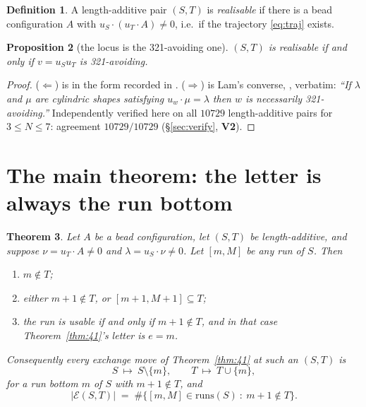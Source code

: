 \documentclass[11pt]{article}
\theoremstyle{plain}
\newtheorem{thm}{Theorem}[section]
\newtheorem{prop}[thm]{Proposition}
\theoremstyle{definition}
\newtheorem{defn}[thm]{Definition}
\begin{document}
\begin{defn}
A length-additive pair $(S,T)$ is \emph{realisable} if there is a bead configuration $A$ with
$u_S\cdot(u_T\cdot A)\ne0$, i.e.\ if the trajectory \eqref{eq:traj} exists.
\end{defn}

\begin{prop}[the locus is the 321-avoiding one]\label{prop:locus}
$(S,T)$ is realisable if and only if $v=u_Su_T$ is 321-avoiding.
\end{prop}

\begin{proof}
($\Leftarrow$) is \cite[\texttt{thm:321}, l.1844--47]{Lam2006} in the form recorded in
\cite[Thm.~5.2]{Clio321}. ($\Rightarrow$) is Lam's converse,
\cite[l.1871--73]{Lam2006}, verbatim: \emph{``If $\lambda$ and $\mu$ are cylindric shapes
satisfying $u_w\cdot\mu=\lambda$ then $w$ is necessarily 321-avoiding.''}
Independently verified here on all $10729$ length-additive pairs for $3\le N\le7$: agreement
$10729/10729$ (\S\ref{sec:verify}, \textbf{V2}).
\end{proof}

\section{The main theorem: the letter is always the run bottom}\label{sec:main}

\begin{thm}\label{thm:main}
Let $A$ be a bead configuration, let $(S,T)$ be length-additive, and suppose
$\nu=u_T\cdot A\ne0$ and $\lambda=u_S\cdot\nu\ne0$. Let $[m,M]$ be any run of $S$. Then
\begin{enumerate}
\item[(a)] $m\notin T$;
\item[(b)] either $m+1\notin T$, or $[m+1,M+1]\subseteq T$;
\item[(c)] the run is usable if and only if $m+1\notin T$, and in that case Theorem~\ref{thm:41}'s
letter is $e=m$.
\end{enumerate}
Consequently every exchange move of Theorem~\ref{thm:41} at such an $(S,T)$ is
\[
  S\ \mapsto\ S\setminus\{m\},\qquad T\ \mapsto\ T\cup\{m\},
\]
for a run bottom $m$ of $S$ with $m+1\notin T$, and
\begin{equation}\label{eq:count}
  |\mathcal{E}(S,T)|\;=\;\#\{[m,M]\in\mathrm{runs}(S)\ :\ m+1\notin T\}.
\end{equation}
\end{thm}
\end{document}
